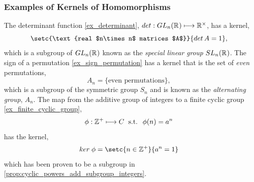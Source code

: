 \documentclass[MathsNotesBase.tex]{subfiles}
\begin{document}
{		\subsubsection{Examples of Kernels of Homomorphisms}
		\begin{exe}
			\ex The determinant function \ref{ex_determinant}, $ det : GL_n(\mathbb{R}^{}) \longmapsto \mathbb{R}^{\times} $, has a kernel,
			\[ \setc{\text{real $n\times n$ matrices $A$}}{det \, A = 1}, \]
			which is a subgroup of $GL_n(\mathbb{R}^{})$ known as the \textit{special linear group} $SL_n(\mathbb{R}^{})$.
			\label{ex_special_lin_group}
			\ex The sign of a permutation \ref{ex_sign_permutation} has a kernel that is the set of \textit{even} permutations,
			\[ A_n = \{\text{even permutations}\}, \]
			which is a subgroup of the symmetric group $S_n$ and is known as the \textit{alternating group}, $A_n$.
			\label{ex_alternating_group}
			\ex The map from the additive group of integers to a finite cyclic group \ref{ex_finite_cyclic_group},
			\[ \phi : \mathbb{Z}^{+} \longmapsto C \; \text{ s.t. } \; \phi(n) = a^n \]
			has the kernel,
			\[ ker \; \phi = \setc{n \in \Z{+}}{a^n = 1} \]
			which has been proven to be a subgroup in \autoref{prop:cyclic_powers_add_subgroup_integers}.
			\label{ex_kernel_cyclic_powers}
		\end{exe}
	}
\end{document}
